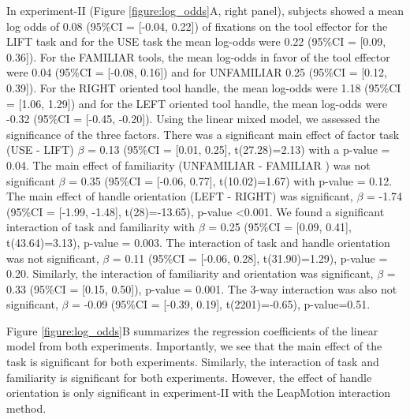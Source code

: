 In experiment-II (Figure \ref{figure:log_odds}A, right panel), subjects showed a mean log odds of 0.08 (95\%CI = [-0.04, 0.22]) of fixations on the tool effector for the LIFT task and for the USE task the mean log-odds were 0.22 (95\%CI = [0.09, 0.36]). For the FAMILIAR tools, the mean log-odds in favor of the tool effector were 0.04 (95\%CI = [-0.08, 0.16]) and for UNFAMILIAR 0.25 (95\%CI = [0.12, 0.39]). For the RIGHT oriented tool handle, the mean log-odds were 1.18 (95\%CI = [1.06, 1.29]) and for the LEFT oriented tool handle, the mean log-odds were -0.32 (95\%CI = [-0.45, -0.20]).  Using the linear mixed model, we assessed the significance of the three factors. There was a significant main effect of factor task (USE - LIFT) $\beta$ = 0.13  (95\%CI = [0.01, 0.25], t(27.28)=2.13) with a p-value = 0.04. The main effect of familiarity (UNFAMILIAR - FAMILIAR ) was not significant $\beta$ = 0.35  (95\%CI = [-0.06, 0.77], t(10.02)=1.67) with p-value = 0.12. The main effect of handle orientation (LEFT - RIGHT) was significant, $\beta$ = -1.74 (95\%CI = [-1.99, -1.48], t(28)=-13.65), p-value <0.001. We found a significant interaction of task and familiarity with $\beta$ = 0.25 (95\%CI = [0.09, 0.41], t(43.64)=3.13), p-value = 0.003. The interaction of task and handle orientation was not significant, $\beta$ = 0.11 (95\%CI = [-0.06, 0.28], t(31.90)=1.29), p-value = 0.20. Similarly, the interaction of familiarity and orientation was significant, $\beta$ = 0.33 (95\%CI = [0.15, 0.50]), p-value = 0.001. The 3-way interaction was also not significant, $\beta$ = -0.09 (95\%CI = [-0.39, 0.19], t(2201)=-0.65), p-value=0.51.

Figure \ref{figure:log_odds}B summarizes the regression coefficients of the linear model from both experiments. Importantly, we see that the main effect of the task is significant for both experiments. Similarly, the interaction of task and familiarity is significant for both experiments. However, the effect of handle orientation is only significant in experiment-II with the LeapMotion interaction method. 

